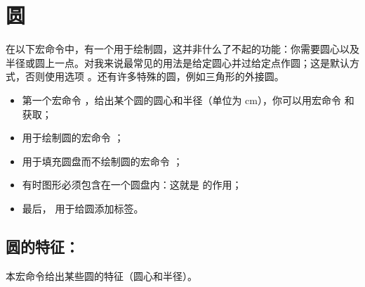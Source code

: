 \newpage
\section{圆}

在以下宏命令中，有一个用于绘制圆，这并非什么了不起的功能：你需要圆心以及半径或圆上一点。对我来说最常见的用法是给定圆心并过给定点作圆；这是默认方式，否则使用选项 。还有许多特殊的圆，例如三角形的外接圆。

\begin{itemize}
  \item 第一个宏命令 ，给出某个圆的圆心和半径（单位为 cm），你可以用宏命令  和  获取；
 
 \item 用于绘制圆的宏命令 ；
 
 \item 用于填充圆盘而不绘制圆的宏命令 ；
 
 \item 有时图形必须包含在一个圆盘内：这就是  的作用；
  
 \item 最后， 用于给圆添加标签。
\end{itemize} 

\subsection{圆的特征：}
 
本宏命令给出某些圆的特征（圆心和半径）。

